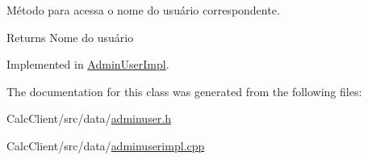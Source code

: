 Método para acessa o nome do usuário correspondente. 

\begin{DoxyReturn}{Returns}
Nome do usuário 
\end{DoxyReturn}


Implemented in \hyperlink{classAdminUserImpl_af66494cfe7eecb1199cfc3295c009f2c}{Admin\+User\+Impl}.



The documentation for this class was generated from the following files\+:\begin{DoxyCompactItemize}
\item 
Calc\+Client/src/data/\hyperlink{adminuser_8h}{adminuser.\+h}\item 
Calc\+Client/src/data/\hyperlink{adminuserimpl_8cpp}{adminuserimpl.\+cpp}\end{DoxyCompactItemize}
